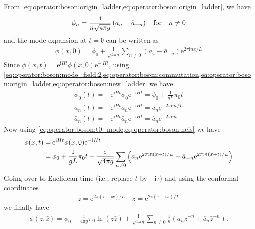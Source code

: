 \documentclass[10pt]{article}
\newcommand{\me}{\mathrm{e}}
\newcommand{\ii}{\mathrm{i}}
\begin{document}
From \cref{eq:operator:boson:origin_ladder,eq:operator:boson:origin_ladder}, we have
\begin{align}
    \phi_n=\frac{\ii}{n\sqrt{4\pi g}}\left(a_n-\bar{a}_{-n}\right)\qfor n\neq0
\end{align}
and the mode expansion at $t=0$ can be written as
\begin{align}
    \phi(x,0)=\phi_0+\frac{\ii}{\sqrt{4\pi g}}\sum_{n\neq0}\left(a_n-\bar{a}_{-n}\right)\me^{2\pi\ii nx/L}\label{eq:operator:boson:t0_mode}
\end{align}
Since $\phi(x,t)=\me^{\ii Ht}\phi(x,0)\me^{-\ii Ht}$, using \cref{eq:operator:boson:mode_field:2,eq:operator:boson:commutation,eq:operator:boson:origin_ladder,eq:operator:boson:new_ladder} we have
\begin{subequations}\label{eq:operator:boson:heis}
    \begin{align}
        \phi_0(t)=    & \me^{\ii Ht}\phi_0\me^{-\ii Ht}=\phi_0+\frac{1}{gL}\pi_0 t    \\
        a_n(t)=       & \me^{\ii Ht}a_n\me^{-\ii Ht}=a_n\me^{-2\pi\ii nt/L}           \\
        \bar{a}_n(t)= & \me^{\ii Ht}\bar{a}_n\me^{-\ii Ht}=\bar{a}_n\me^{-2\pi\ii nt}
    \end{align}
\end{subequations}
Now using \cref{eq:operator:boson:t0_mode,eq:operator:boson:heis} we have
\begin{align}
    \phi(x,t) & =\me^{\ii Ht}\phi(x,0)\me^{-\ii Ht}\notag                                                                                                   \\
              & =\phi_0+\frac{1}{gL}\pi_0 t+\frac{\ii}{\sqrt{4\pi g}}\sum_{n\neq0}\left(a_n\me^{2\pi\ii n(x-t)/L}-\bar{a}_{-n}\me^{2\pi\ii n(x+t)/L}\right)
\end{align}
Going over to Euclidean time (i.e., replace $t$ by $-\ii\tau$) and using the conformal coordinates
\begin{align}
    z=\me^{2\pi(\tau-\ii x)/L}\quad \bar{z}=\me^{2\pi(\tau+\ii x)/L}
\end{align}
we finally have
\begin{align}
    \phi(z,\bar{z})=\phi_0-\frac{\ii}{4\pi g}\pi_0\ln(z\bar{z})+\frac{\ii}{\sqrt{4\pi g}}\sum_{n\neq0}\frac{1}{n}\left(a_n z^{-n}+\bar{a}_n\bar{z}^{-n}\right).\label{eq:operator:boson:phi_expan}
\end{align}
\end{document}
